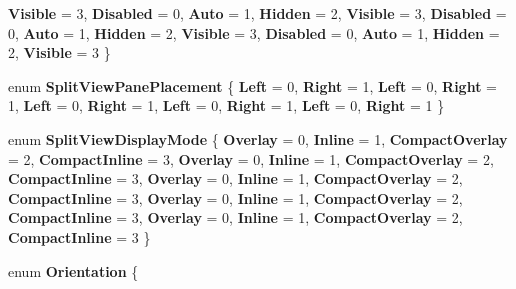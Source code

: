\begin{DoxyCompactItemize}
{\bfseries Visible} = 3, 
\newline
{\bfseries Disabled} = 0, 
{\bfseries Auto} = 1, 
{\bfseries Hidden} = 2, 
{\bfseries Visible} = 3, 
\newline
{\bfseries Disabled} = 0, 
{\bfseries Auto} = 1, 
{\bfseries Hidden} = 2, 
{\bfseries Visible} = 3, 
\newline
{\bfseries Disabled} = 0, 
{\bfseries Auto} = 1, 
{\bfseries Hidden} = 2, 
{\bfseries Visible} = 3
 \}
\item 
\mbox{\label{namespace_windows_1_1_u_i_1_1_xaml_1_1_controls_a9bf3cca91778a25f599f39263931d8f8}} 
enum {\bfseries Split\+View\+Pane\+Placement} \{ \newline
{\bfseries Left} = 0, 
{\bfseries Right} = 1, 
{\bfseries Left} = 0, 
{\bfseries Right} = 1, 
\newline
{\bfseries Left} = 0, 
{\bfseries Right} = 1, 
{\bfseries Left} = 0, 
{\bfseries Right} = 1, 
\newline
{\bfseries Left} = 0, 
{\bfseries Right} = 1
 \}
\item 
\mbox{\label{namespace_windows_1_1_u_i_1_1_xaml_1_1_controls_a027ad5600573e78453a72cce427da307}} 
enum {\bfseries Split\+View\+Display\+Mode} \{ \newline
{\bfseries Overlay} = 0, 
{\bfseries Inline} = 1, 
{\bfseries Compact\+Overlay} = 2, 
{\bfseries Compact\+Inline} = 3, 
\newline
{\bfseries Overlay} = 0, 
{\bfseries Inline} = 1, 
{\bfseries Compact\+Overlay} = 2, 
{\bfseries Compact\+Inline} = 3, 
\newline
{\bfseries Overlay} = 0, 
{\bfseries Inline} = 1, 
{\bfseries Compact\+Overlay} = 2, 
{\bfseries Compact\+Inline} = 3, 
\newline
{\bfseries Overlay} = 0, 
{\bfseries Inline} = 1, 
{\bfseries Compact\+Overlay} = 2, 
{\bfseries Compact\+Inline} = 3, 
\newline
{\bfseries Overlay} = 0, 
{\bfseries Inline} = 1, 
{\bfseries Compact\+Overlay} = 2, 
{\bfseries Compact\+Inline} = 3
 \}
\item 
\mbox{\label{namespace_windows_1_1_u_i_1_1_xaml_1_1_controls_a55286136757833c08ae3e37673161c2c}} 
enum {\bfseries Orientation} \{ \newline

\end{DoxyCompactItemize}
